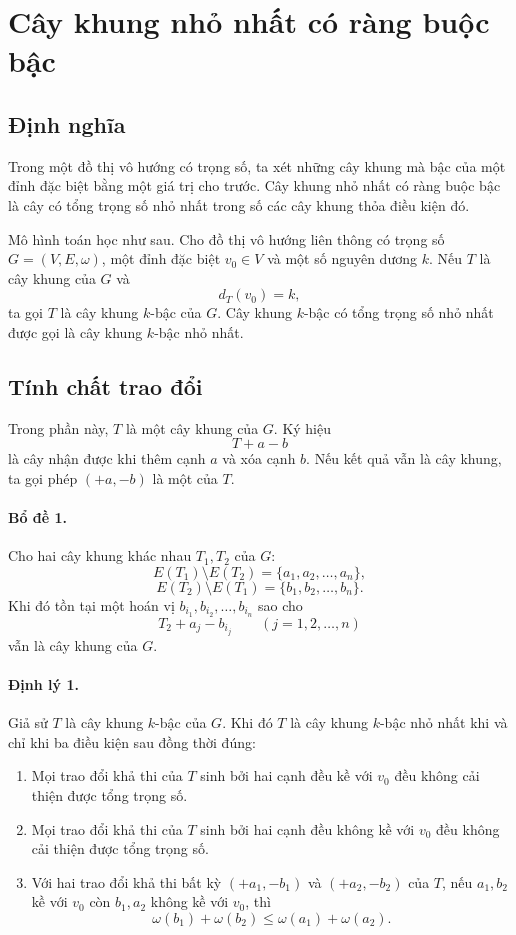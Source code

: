 \documentclass[11pt]{article}
\begin{document}
\section{Cây khung nhỏ nhất có ràng buộc bậc}

\subsection{Định nghĩa}

Trong một đồ thị vô hướng có trọng số, ta xét những cây khung mà bậc của một
đỉnh đặc biệt bằng một giá trị cho trước. Cây khung nhỏ nhất có ràng buộc bậc
là cây có tổng trọng số nhỏ nhất trong số các cây khung thỏa điều kiện đó.

Mô hình toán học như sau. Cho đồ thị vô hướng liên thông có trọng số
$G=(V,E,\omega)$, một đỉnh đặc biệt $v_0\in V$ và một số nguyên dương $k$. Nếu
$T$ là cây khung của $G$ và
\[
  d_T(v_0)=k,
\]
ta gọi $T$ là cây khung $k$-bậc của $G$. Cây khung $k$-bậc có tổng trọng số
nhỏ nhất được gọi là cây khung $k$-bậc nhỏ nhất.

\subsection{Tính chất trao đổi}

Trong phần này, $T$ là một cây khung của $G$. Ký hiệu
\[
  T+a-b
\]
là cây nhận được khi thêm cạnh $a$ và xóa cạnh $b$. Nếu kết quả vẫn là cây
khung, ta gọi phép $(+a,-b)$ là một  của $T$.

\paragraph{Bổ đề 1.}
Cho hai cây khung khác nhau $T_1,T_2$ của $G$:
\[
  E(T_1)\setminus E(T_2)=\{a_1,a_2,\ldots,a_n\},
\]
\[
  E(T_2)\setminus E(T_1)=\{b_1,b_2,\ldots,b_n\}.
\]
Khi đó tồn tại một hoán vị $b_{i_1},b_{i_2},\ldots,b_{i_n}$ sao cho
\[
  T_2+a_j-b_{i_j}\qquad (j=1,2,\ldots,n)
\]
vẫn là cây khung của $G$.

\paragraph{Định lý 1.}
Giả sử $T$ là cây khung $k$-bậc của $G$. Khi đó $T$ là cây khung $k$-bậc nhỏ
nhất khi và chỉ khi ba điều kiện sau đồng thời đúng:
\begin{enumerate}
  \item Mọi trao đổi khả thi của $T$ sinh bởi hai cạnh đều kề với $v_0$ đều
  không cải thiện được tổng trọng số.
  \item Mọi trao đổi khả thi của $T$ sinh bởi hai cạnh đều không kề với $v_0$
  đều không cải thiện được tổng trọng số.
  \item Với hai trao đổi khả thi bất kỳ $(+a_1,-b_1)$ và $(+a_2,-b_2)$ của
  $T$, nếu $a_1,b_2$ kề với $v_0$ còn $b_1,a_2$ không kề với $v_0$, thì
  \[
    \omega(b_1)+\omega(b_2)\le \omega(a_1)+\omega(a_2).
  \]
\end{enumerate}
\end{document}
